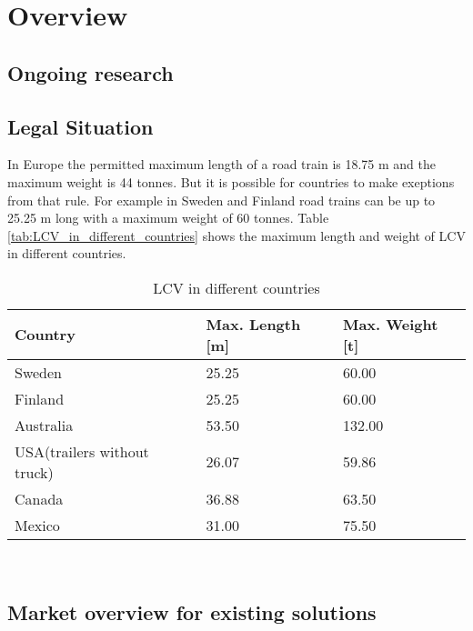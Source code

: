 \documentclass[ExampleMasters.tex]{subfiles}
\begin{document}
\clearpage
\chapter{Overview}
\label{chap:overview}
\section{Ongoing research}
\label{sec:ongoing_research}
\section{Legal Situation}
\label{sec:legal_situation}
In Europe the permitted maximum length of a road train is 18.75 m and the maximum weight is 44 tonnes. But it is possible for countries to make exeptions from that rule.\cite{96/53/EC}  For example in Sweden and Finland road trains can be up to 25.25 m long with a  maximum weight of 60 tonnes.\cite{Vaegverket}
Table \ref{tab:LCV_in_different_countries} shows the maximum length and weight of LCV in different countries.

\begin{table}[h]
	\centering
	\caption{LCV in different countries}
	\label{tab:LVC_in_different_countries}
	\begin{tabular}{l|l|l|}
		Country   & Max. Length [m] & Max. Weight [t] \\ \hline
		Sweden    &       25.25      &       60.00      \\
		Finland   &            25.25 &         60.00    \\
		Australia &      53.50       &           132.00  \\
		USA(trailers without truck)&      26.07       &    59.86        \\
		Canada & 36.88 & 63.50 \\
		Mexico & 31.00 & 75.50 \\
	\end{tabular} \\
\end{table}
\section{Market overview for existing solutions}

\label{sec:market_overview}
\end{document}
